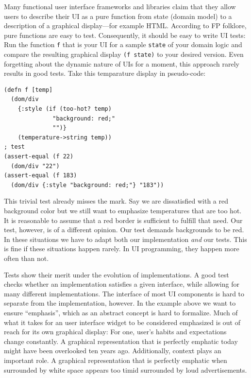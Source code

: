 \documentclass[sigplan,review,screen]{acmart}
\begin{document}
Many functional user interface frameworks and libraries claim that
they allow users to describe their UI as a pure function from state
(domain model) to a description of a graphical display---for example
HTML. According to FP folklore, pure functions are easy to
test. Consequently, it should be easy to write UI tests: Run the
function \texttt{f} that is your UI for a sample \texttt{state} of
your domain logic and compare the resulting graphical display
\texttt{(f state)} to your desired version. Even forgetting about
the dynamic nature of UIs for a moment, this approach rarely results
in good tests. Take this temparature display in pseudo-code:
%
\begin{verbatim}
(defn f [temp]
  (dom/div
    {:style (if (too-hot? temp)
              "background: red;"
              "")}
    (temperature->string temp))
; test
(assert-equal (f 22)
  (dom/div "22")
(assert-equal (f 183)
  (dom/div {:style "background: red;"} "183"))
\end{verbatim}
%
This trivial test already misses the mark. Say we are dissatisfied
with a red background color but we still want to emphasize
temperatures that are too hot. It is reasonable to assume that a red
border is sufficient to fulfill that need. Our test, however, is of a
different opinion. Our test demands backgrounds to be red. In these
situations we have to adapt both our implementation \textit{and} our
tests. This is fine if these situations happen rarely. In UI
programming, they happen more often than not.

Tests show their merit under the evolution of implementations. A good
test checks whether an implementation satisfies a given interface,
while allowing for many different implementations. The interface of
most UI components is hard to separate from the implementation,
however. In the example above we want to ensure ``emphasis'', which as
an abstract concept is hard to formalize. Much of what it takes for an
user interface widget to be considered emphasized is out of reach for
its own graphical display: For one, user's habits and expectations
change constantly. A graphical representation that is perfectly
emphatic today might have been overlooked ten years ago. Additionally,
context plays an important role. A graphical representation that is
perfectly emphatic when surrounded by white space appears too timid
surrounded by loud advertisements.
\end{document}
